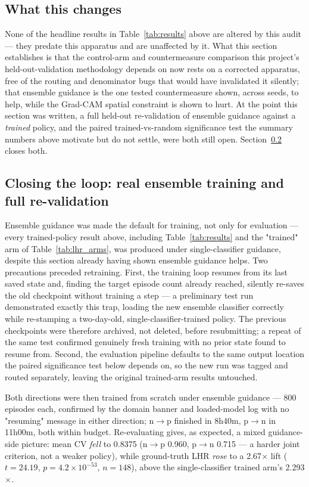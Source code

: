 \documentclass[11pt]{article}
\begin{document}
\subsection{What this changes}

None of the headline results in Table~\ref{tab:results} above are altered
by this audit — they predate this apparatus and are unaffected by it. What
this section establishes is that the control-arm and countermeasure
comparison this project's held-out-validation methodology depends on now
rests on a corrected apparatus, free of the routing and denominator bugs
that would have invalidated it silently; that ensemble guidance is the one
tested countermeasure shown, across seeds, to help, while the Grad-CAM
spatial constraint is shown to hurt. At the point this section was written,
a full held-out re-validation of ensemble guidance against a
\emph{trained} policy, and the paired trained-vs-random significance test
the summary numbers above motivate but do not settle, were both still open.
Section~\ref{sec:closing} closes both.

\subsection{Closing the loop: real ensemble training and full re-validation}
\label{sec:closing}

Ensemble guidance was made the default for training, not only for
evaluation — every trained-policy result above, including
Table~\ref{tab:results} and the "trained" arm of Table~\ref{tab:lhr_arms},
was produced under single-classifier guidance, despite this section
already having shown ensemble guidance helps. Two precautions preceded
retraining. First, the training loop resumes from its last saved state
and, finding the target episode count already reached, silently re-saves
the old checkpoint without training a step — a preliminary test run
demonstrated exactly this trap, loading the new ensemble classifier
correctly while re-stamping a two-day-old, single-classifier-trained
policy. The previous checkpoints were therefore archived, not deleted,
before resubmitting; a repeat of the same test confirmed genuinely fresh
training with no prior state found to resume from. Second, the evaluation
pipeline defaults to the same output location the paired significance test
below depends on, so the new run was tagged and routed separately,
leaving the original trained-arm results untouched.

Both directions were then trained from scratch under ensemble guidance —
800 episodes each, confirmed by the domain banner and loaded-model log
with no "resuming" message in either direction; n$\to$p finished in 8h40m,
p$\to$n in 11h00m, both within budget. Re-evaluating gives, as expected, a
mixed guidance-side picture: mean CV \emph{fell} to 0.8375 (n$\to$p 0.960,
p$\to$n 0.715 — a harder joint criterion, not a weaker policy), while
ground-truth LHR \emph{rose} to a 2.67$\times$ lift ($t=24.19$,
$p=4.2\times10^{-53}$, $n=148$), above the single-classifier trained arm's
2.293$\times$.
\end{document}
